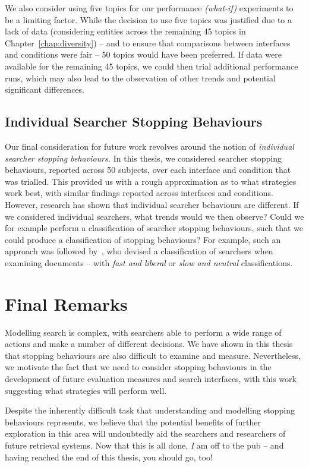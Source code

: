 We also consider using five topics for our performance \emph{(what-if)} experiments to be a limiting factor. While the decision to use five topics was justified due to a lack of data (considering entities across the remaining 45 topics in Chapter~\ref{chap:diversity}) -- and to ensure that comparisons between interfaces and conditions were fair -- 50 topics would have been preferred. If data were available for the remaining 45 topics, we could then trial additional performance runs, which may also lead to the observation of other trends and potential significant differences.

\subsection{Individual Searcher Stopping Behaviours}
Our final consideration for future work revolves around the notion of \emph{individual searcher stopping behaviours.} In this thesis, we considered searcher stopping behaviours, reported across \~50 subjects, over each interface and condition that was trialled. This provided us with a rough approximation as to what strategies work best, with similar findings reported across interfaces and conditions. However, research has shown that individual searcher behaviours are different. If we considered individual searchers, what trends would we then observe? Could we for example perform a classification of searcher stopping behaviours, such that we could produce a classification of stopping behaviours? For example, such an approach was followed by~\cite{smucker2011user_strategies}, who devised a classification of searchers when examining documents -- with \emph{fast and liberal} or \emph{slow and neutral} classifications.

\section{Final Remarks}\label{sec:conclusions:remarks}
Modelling search is complex, with searchers able to perform a wide range of actions and make a number of different decisions. We have shown in this thesis that stopping behaviours are also difficult to examine and measure. Nevertheless, we motivate the fact that we need to consider stopping behaviours in the development of future evaluation measures and search interfaces, with this work suggesting what strategies will perform well.

Despite the inherently difficult task that understanding and modelling stopping behaviours represents, we believe that the potential benefits of further exploration in this area will undoubtedly aid the searchers and researchers of future retrieval systems. Now that this is all done, \emph{I} am off to the pub -- and having reached the end of this thesis, you should go, too!